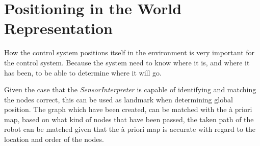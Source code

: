 \section{Positioning in the World Representation}
How the control system positions itself in the environment is very important for the
control system. Because the system need to know where it is, and where it has been, to be
able to determine where it will go. 

Given the case that the \emph{SensorInterpreter} is capable of identifying and matching
the nodes correct, this can be used as landmark when determining global position. The
graph which have been created, can be matched with the \`a priori map, based on what kind
of nodes that have been passed, the taken path of the robot can be matched given that the
\`a priori map is accurate with regard to the location and order of the nodes. 

